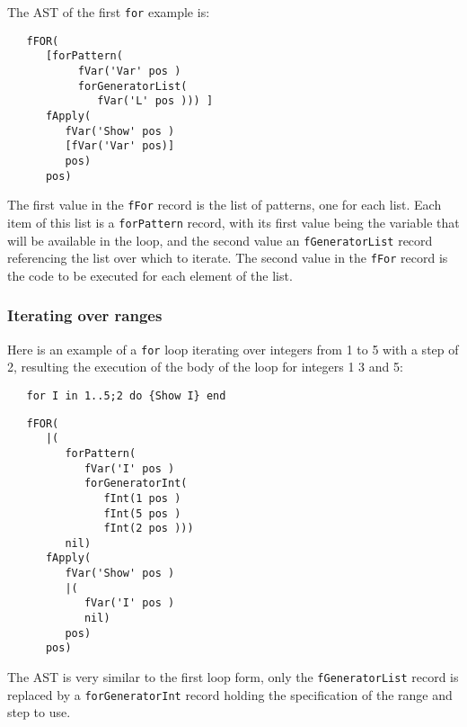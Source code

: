 \documentclass[a4paper]{memoir}
\begin{document}
The AST of the first \lstinline!for! example is:
\begin{lstlisting}
   fFOR(
      [forPattern(
           fVar('Var' pos )
           forGeneratorList(
              fVar('L' pos ))) ]
      fApply(
         fVar('Show' pos )
         [fVar('Var' pos)]
         pos)
      pos)
\end{lstlisting}

The first value in the \lstinline!fFor! record is the list of patterns, one
for each list. Each item of this list is a \lstinline!forPattern! record, with
its first value being the variable that will be available in the loop, and the
second value an \lstinline!fGeneratorList! record referencing the list over which to
iterate.
The second value in the \lstinline!fFor! record is the code to be executed for
each element of the list.

\subsubsection{Iterating over ranges}
Here is an example of a \lstinline!for! loop iterating over integers from 1 to 5
with a step of 2, resulting the execution of the body of the loop for integers 1
3 and 5:
\begin{lstlisting}
   for I in 1..5;2 do {Show I} end
\end{lstlisting}

\begin{lstlisting}
   fFOR(
      |(
         forPattern(
            fVar('I' pos )
            forGeneratorInt(
               fInt(1 pos )
               fInt(5 pos )
               fInt(2 pos )))
         nil)
      fApply(
         fVar('Show' pos )
         |(
            fVar('I' pos )
            nil)
         pos)
      pos)
\end{lstlisting}

The AST is very similar to the first loop form, only the
\lstinline!fGeneratorList! record is replaced by a \lstinline!forGeneratorInt!
record holding the specification of the range and step to use.
\end{document}
